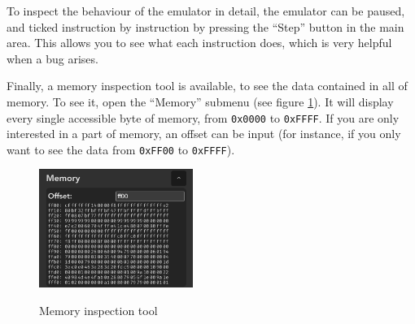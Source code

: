 To inspect the behaviour of the emulator in detail, the emulator can be paused, and ticked instruction by instruction by pressing the ``Step'' button in the main area. This allows you to see what each instruction does, which is very helpful when a bug arises.

Finally, a memory inspection tool is available, to see the data contained in all of memory. To see it, open the ``Memory'' submenu (see figure \ref{fig:memory-inspect}). It will display every single accessible byte of memory, from \texttt{0x0000} to \texttt{0xFFFF}. If you are only interested in a part of memory, an offset can be input (for instance, if you only want to see the data from \texttt{0xFF00} to \texttt{0xFFFF}).

\begin{figure}[h]
    \centering
    \includegraphics[width=5cm]{images/memory-inspect}\\
    \caption{Memory inspection tool}
    \label{fig:memory-inspect}
\end{figure}